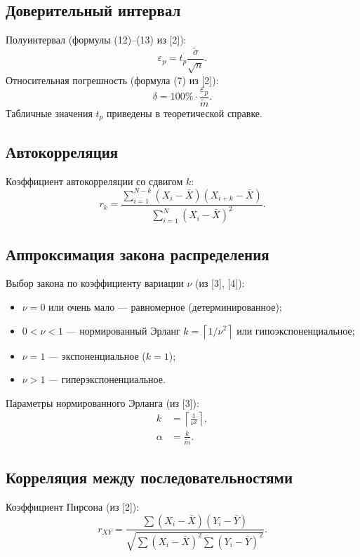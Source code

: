 \documentclass[a4paper,12pt]{article}
\begin{document}
\subsection{Доверительный интервал}
Полуинтервал (формулы (12)–(13) из [2]):
\begin{equation}\label{eq:ref_epsilon}
\varepsilon_p = t_p \frac{\tilde{\sigma}}{\sqrt{n}}.
\end{equation}
Относительная погрешность (формула (7) из [2]):
\begin{equation}\label{eq:ref_delta}
\delta = 100\% \cdot \frac{\varepsilon_p}{\tilde{m}}.
\end{equation}
Табличные значения $t_p$ приведены в теоретической справке.

\subsection{Автокорреляция}
Коэффициент автокорреляции со сдвигом $k$:
\begin{equation}\label{eq:ref_ac}
r_k = \frac{\sum_{i=1}^{N-k}(X_i - \bar{X})(X_{i+k} - \bar{X})}{\sum_{i=1}^{N}(X_i - \bar{X})^2}.
\end{equation}

\subsection{Аппроксимация закона распределения}
Выбор закона по коэффициенту вариации $\nu$ (из [3], [4]):
\begin{itemize}
    \item $\nu = 0$ или очень мало — равномерное (детерминированное);
    \item $0 < \nu < 1$ — нормированный Эрланг $k = \left\lceil 1/\nu^2 \right\rceil$ или гипоэкспоненциальное;
    \item $\nu = 1$ — экспоненциальное ($k=1$);
    \item $\nu > 1$ — гиперэкспоненциальное.
\end{itemize}
Параметры нормированного Эрланга (из [3]):
\begin{align}\label{eq:ref_erl_k}
k &= \left\lceil \frac{1}{\nu^2} \right\rceil, \\
\alpha &= \frac{k}{\tilde{m}}.
\end{align}

\subsection{Корреляция между последовательностями}
Коэффициент Пирсона (из [2]):
\begin{equation}\label{eq:ref_corr}
r_{XY} = \frac{\sum (X_i - \bar{X})(Y_i - \bar{Y})}{\sqrt{\sum (X_i - \bar{X})^2 \sum (Y_i - \bar{Y})^2}}.
\end{equation}
\end{document}
